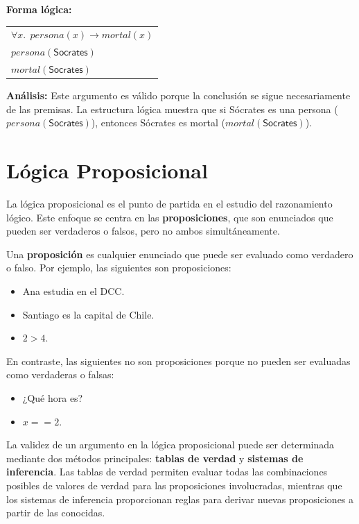 \textbf{Forma lógica:}

\begin{center}
\begin{tabular}{l}
$\forall x.~~\mathit{persona}(x) \rightarrow \mathit{mortal}(x)$ \\
$\mathit{persona}(\mathsf{Socrates})$ \\
\hline
$ \mathit{mortal}(\mathsf{Socrates})$
\end{tabular}
\end{center}

\textbf{Análisis:} Este argumento es válido porque la conclusión se sigue necesariamente de las premisas. La estructura lógica muestra que si Sócrates es una persona ($\mathit{persona}(\mathsf{Socrates})$), entonces Sócrates es mortal ($\mathit{mortal}(\mathsf{Socrates})$).







\section{Lógica Proposicional}

La lógica proposicional es el punto de partida en el estudio del razonamiento lógico. Este enfoque se centra en las \textbf{proposiciones}, que son enunciados que pueden ser verdaderos o falsos, pero no ambos simultáneamente.

Una \textbf{proposición} es cualquier enunciado que puede ser evaluado como verdadero o falso. Por ejemplo, las siguientes son proposiciones:
\begin{itemize}
    \item Ana estudia en el DCC.
    \item Santiago es la capital de Chile.
    \item $2 > 4$.
\end{itemize}
En contraste, las siguientes no son proposiciones porque no pueden ser evaluadas como verdaderas o falsas:
\begin{itemize}
    \item ¿Qué hora es?
    \item $x == 2$.
\end{itemize}

La validez de un argumento en la lógica proposicional puede ser determinada mediante dos métodos principales: \textbf{tablas de verdad} y \textbf{sistemas de inferencia}. Las tablas de verdad permiten evaluar todas las combinaciones posibles de valores de verdad para las proposiciones involucradas, mientras que los sistemas de inferencia proporcionan reglas para derivar nuevas proposiciones a partir de las conocidas.

